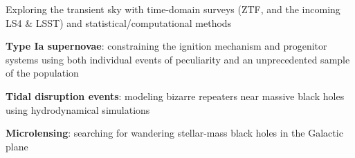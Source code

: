 


\begin{cvpubs}


\cvpub
{ %
\begin{cvitems}
\item Exploring the transient sky with time-domain surveys (ZTF, and the incoming LS4 \& LSST) and statistical/computational methods
\item {\bf\color{darktext}Type Ia supernovae}: constraining the ignition mechanism and progenitor systems using both individual events of peculiarity and an unprecedented sample of the population
\item {\bf\color{darktext}Tidal disruption events}: modeling bizarre repeaters near massive black holes using hydrodynamical simulations
\item {\bf\color{darktext}Microlensing}: searching for wandering stellar-mass black holes in the Galactic plane
\end{cvitems}
}


\end{cvpubs}